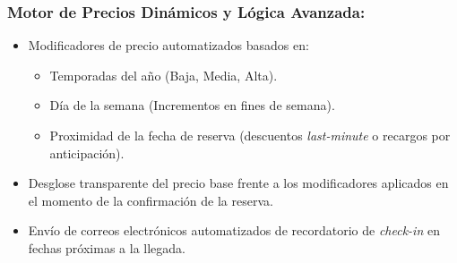 \subsubsection{Motor de Precios Dinámicos y Lógica Avanzada:}

\begin{itemize}
    \item Modificadores de precio automatizados basados en:
    \begin{itemize}
        \item Temporadas del año (Baja, Media, Alta).
        \item Día de la semana (Incrementos en fines de semana).
        \item Proximidad de la fecha de reserva (descuentos \textit{last-minute} o recargos por anticipación).
    \end{itemize}
    \item Desglose transparente del precio base frente a los modificadores aplicados en el momento de la confirmación de la reserva.
    \item Envío de correos electrónicos automatizados de recordatorio de \textit{check-in} en fechas próximas a la llegada.
\end{itemize}